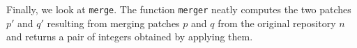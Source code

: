 Finally, we look at \texttt{merge}. The function \texttt{merger} neatly computes the two patches
$p'$ and $q'$ resulting from merging patches $p$ and $q$ from the original repository $n$
and returns a pair of integers obtained by applying them.
\begin{code}%
%
\>[2]\AgdaSpace{}%
\AgdaSymbol{:}\AgdaSpace{}%
\AgdaSpace{}%
\AgdaSpace{}%
\AgdaSpace{}%
\AgdaSpace{}%
\AgdaSpace{}%
\AgdaSpace{}%
\AgdaSpace{}%
\AgdaSpace{}%
\<%
\\
%
\>[2]\AgdaSpace{}%
\AgdaSpace{}%
\AgdaSpace{}%
\AgdaSpace{}%
\AgdaSymbol{=}\AgdaSpace{}%
%
\>[145I]\AgdaSpace{}%
\AgdaSymbol{=}\AgdaSpace{}%
\AgdaSpace{}%
\AgdaSpace{}%
\<%
\\
\>[.][@{}l@{}]\<[145I]%
\>[21]\AgdaSpace{}%
\AgdaSymbol{=}\AgdaSpace{}%
\AgdaSpace{}%
\AgdaSpace{}%
\<%
\\
%
\>[21]\AgdaSymbol{(}\AgdaSpace{}%
\AgdaOperator{\AgdaInductiveConstructor{,}}\AgdaSpace{}%
\AgdaSymbol{)}\AgdaSpace{}%
\AgdaSymbol{=}\AgdaSpace{}%
\AgdaSpace{}%
\AgdaSymbol{(}\AgdaSpace{}%
\AgdaOperator{\AgdaInductiveConstructor{,}}\AgdaSpace{}%
\AgdaSymbol{)}\<%
\\
\>[2][@{}l@{\AgdaIndent{0}}]%
\>[4]\AgdaSpace{}%
\AgdaSymbol{(}\AgdaSpace{}%
\AgdaSpace{}%
\AgdaSpace{}%
\AgdaOperator{\AgdaInductiveConstructor{,}}\AgdaSpace{}%
\AgdaSpace{}%
\AgdaSpace{}%
\AgdaSymbol{)}\<%
\end{code}

